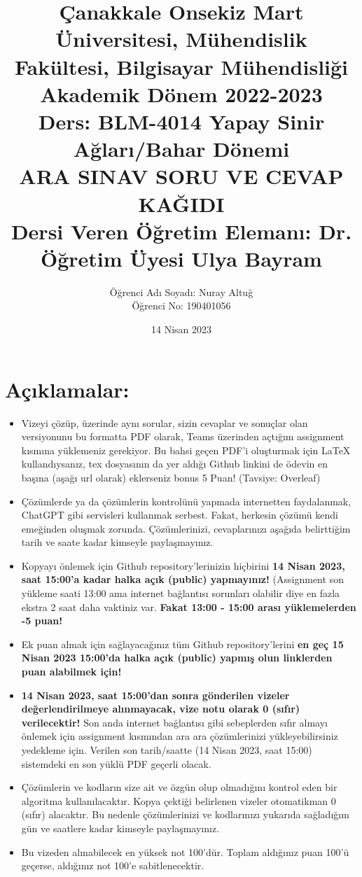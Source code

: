\documentclass[11pt]{article}
\title{Çanakkale Onsekiz Mart Üniversitesi, Mühendislik Fakültesi, Bilgisayar Mühendisliği Akademik Dönem 2022-2023\\
Ders: BLM-4014 Yapay Sinir Ağları/Bahar Dönemi\\ 
ARA SINAV SORU VE CEVAP KAĞIDI\\
Dersi Veren Öğretim Elemanı: Dr. Öğretim Üyesi Ulya Bayram}
\author{%
\begin{minipage}{\textwidth}
\raggedright
Öğrenci Adı Soyadı: Nuray Altuğ\\ %
Öğrenci No: 190401056
\end{minipage}%
}
\date{14 Nisan 2023}
\begin{document}
\maketitle

\vspace{-.5in}
\section*{Açıklamalar:}
\begin{itemize}
    \item Vizeyi çözüp, üzerinde aynı sorular, sizin cevaplar ve sonuçlar olan versiyonunu bu formatta PDF olarak, Teams üzerinden açtığım assignment kısmına yüklemeniz gerekiyor. Bu bahsi geçen PDF'i oluşturmak için LaTeX kullandıysanız, tex dosyasının da yer aldığı Github linkini de ödevin en başına (aşağı url olarak) eklerseniz bonus 5 Puan! (Tavsiye: Overleaf)
    \item Çözümlerde ya da çözümlerin kontrolünü yapmada internetten faydalanmak, ChatGPT gibi servisleri kullanmak serbest. Fakat, herkesin çözümü kendi emeğinden oluşmak zorunda. Çözümlerinizi, cevaplarınızı aşağıda belirttiğim tarih ve saate kadar kimseyle paylaşmayınız. 
    \item Kopyayı önlemek için Github repository'lerinizin hiçbirini \textbf{14 Nisan 2023, saat 15:00'a kadar halka açık (public) yapmayınız!} (Assignment son yükleme saati 13:00 ama internet bağlantısı sorunları olabilir diye en fazla ekstra 2 saat daha vaktiniz var. \textbf{Fakat 13:00 - 15:00 arası yüklemelerden -5 puan!}
    \item Ek puan almak için sağlayacağınız tüm Github repository'lerini \textbf{en geç 15 Nisan 2023 15:00'da halka açık (public) yapmış olun linklerden puan alabilmek için!}
    \item \textbf{14 Nisan 2023, saat 15:00'dan sonra gönderilen vizeler değerlendirilmeye alınmayacak, vize notu olarak 0 (sıfır) verilecektir!} Son anda internet bağlantısı gibi sebeplerden sıfır almayı önlemek için assignment kısmından ara ara çözümlerinizi yükleyebilirsiniz yedekleme için. Verilen son tarih/saatte (14 Nisan 2023, saat 15:00) sistemdeki en son yüklü PDF geçerli olacak.
    \item Çözümlerin ve kodların size ait ve özgün olup olmadığını kontrol eden bir algoritma kullanılacaktır. Kopya çektiği belirlenen vizeler otomatikman 0 (sıfır) alacaktır. Bu nedenle çözümlerinizi ve kodlarınızı yukarıda sağladığım gün ve saatlere kadar kimseyle paylaşmayınız.
    \item Bu vizeden alınabilecek en yüksek not 100'dür. Toplam aldığınız puan 100'ü geçerse, aldığınız not 100'e sabitlenecektir.

\end{itemize}
\end{document}
